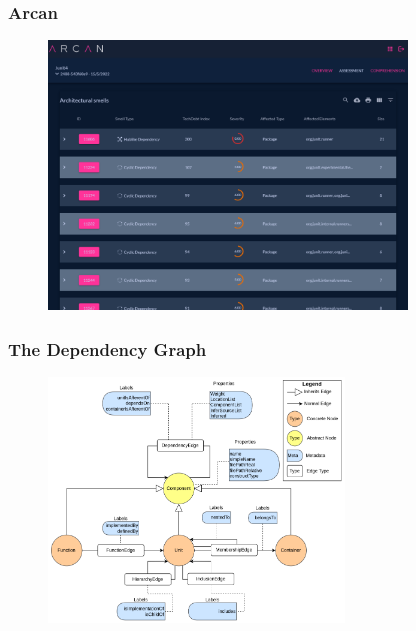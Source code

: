\documentclass[dvipsnames, 10pt, table]{beamer}
\begin{document}
\begin{frame}
  \frametitle{Arcan}
  \begin{figure}
    \begin{center}
      \includegraphics[width=0.85\textwidth]{figures/architectural-smells/arcan-list.png}
    \end{center}
  \end{figure}
\end{frame}

\begin{frame}
  \frametitle{The Dependency Graph}
  \begin{figure}
    \begin{center}
      \includegraphics[width=0.7\textwidth]{figures/architectural-smells/arcan-dep-graph.png}
    \end{center}
  \end{figure}
\end{frame}
\end{document}
